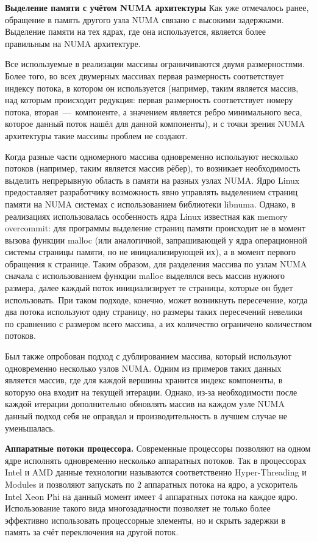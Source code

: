 \documentclass[a4paper,12pt]{extarticle}
\begin{document}
\textbf{Выделение памяти с учётом NUMA архитектуры}
Как уже отмечалось ранее, обращение в память другого узла NUMA связано с высокими задержками. Выделение памяти на тех ядрах, где она используется, является более правильным на NUMA архитектуре.

Все используемые в реализации массивы ограничиваются двумя размерностями. Более того, во всех двумерных массивах первая размерность соответствует индексу потока, в котором он используется (например, таким является массив, над которым происходит редукция: первая размерность соответствует номеру потока, вторая~---~компоненте, а значением является ребро минимального веса, которое данный поток нашёл для данной компоненты), и с точки зрения NUMA архитектуры такие массивы проблем не создают.

Когда разные части одномерного массива одновременно используют несколько потоков (например,  таким является массив рёбер), то возникает необходимость выделить непрерывную область в памяти на разных узлах NUMA. Ядро Linux предоставляет разработчику возможность явно управлять выделением страниц памяти на NUMA системах с использованием библиотеки libnuma. Однако, в реализациях использовалась особенность ядра Linux известная как memory overcommit: для программы выделение страниц памяти происходит не в момент вызова функции malloc (или аналогичной, запрашивающей у ядра операционной системы страницы памяти, но не инициализирующей их), а в момент первого обращения к странице. 
Таким образом, для разделения массива по узлам NUMA сначала с использованием функции malloc выделялся весь массив нужного размера, далее каждый поток инициализирует те страницы, которые он будет использовать. При таком подходе, конечно, может возникнуть пересечение, когда два потока используют одну страницу, но размеры таких пересечений невелики по сравнению с размером всего массива, а их количество ограничено количеством потоков.

Был также опробован подход с дублированием массива, который используют одновременно несколько узлов NUMA. Одним из примеров таких данных является массив, где для каждой вершины хранится индекс компоненты, в которую она входит на текущей итерации. Однако, из-за необходимости после каждой итерации дополнительно обновлять массив на каждом узле NUMA данный подход себя не оправдал и производительность в лучшем случае не уменьшалась.



\textbf{Аппаратные потоки процессора.}
Современные процессоры позволяют на одном ядре исполнять одновременно несколько аппаратных потоков. Так в процессорах Intel и AMD данные технологии называются соответственно Hyper-Threading и Modules и позволяют запускать по 2 аппаратных потока на ядро, а ускоритель Intel Xeon Phi на данный момент имеет 4 аппаратных потока на каждое ядро. Использование такого вида многозадачности позволяет не только более эффективно использовать процессорные элементы, но и скрыть задержки в память за счёт переключения на другой поток.
\end{document}
